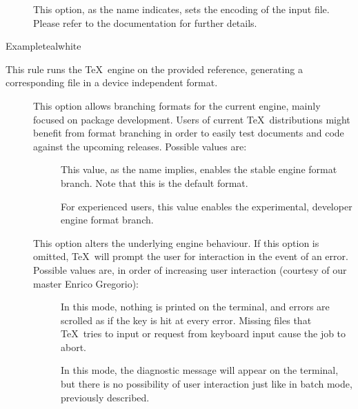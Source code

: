 \begin{description}
\begin{description}
\item[] This option, as the name indicates, sets the encoding of the input file. Please refer to the documentation for further details.
\end{description}

\begin{codebox}{Example}{teal}{\icnote}{white}
\end{codebox}

\item[\rulebox{latex}]
This rule runs the  \TeX\ engine on the provided  reference, generating a corresponding file in a device independent format.

\begin{description}
\item[] This option allows branching formats for the current engine, mainly focused on package development. Users of current \TeX\ distributions might benefit from format branching in order to easily test documents and code against the upcoming releases. Possible values are:

\begin{description}
\item[] This value, as the name implies, enables the stable engine format branch. Note that this is the default format.

\item[] For experienced users, this value enables the experimental, developer engine format branch.
\end{description}

\item[] This option alters the underlying engine behaviour. If this option is omitted, \TeX\ will prompt the user for interaction in the event of an error. Possible values are, in order of increasing user interaction (courtesy of our master Enrico Gregorio):

\begin{description}
\item[] In this mode, nothing is printed on the terminal, and errors are scrolled as if the  key is hit at every error. Missing files that \TeX\ tries to input or request from keyboard input cause the job to abort.

\item[] In this mode, the diagnostic message will appear on the terminal, but there is no possibility of user interaction just like in batch mode, previously described.


\end{description}
\end{description}
\end{description}
